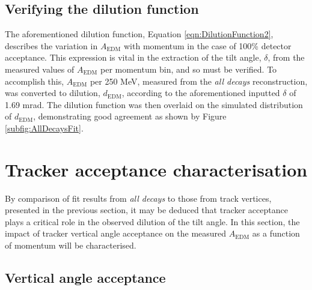 \subsection{Verifying the dilution function}

The aforementioned dilution function, Equation \ref{eqn:DilutionFunction2}, describes the variation in $A_{\text{EDM}}$ with momentum in the case of 100\% detector acceptance. This expression is vital in the extraction of the tilt angle, $\delta$, from the measured values of $A_{\text{EDM}}$ per momentum bin, and so must be verified. To accomplish this, $A_{\text{EDM}}$ per 250 MeV, measured from the \textit{all decays} reconstruction, was converted to dilution, $d_{\text{EDM}}$, according to the aforementioned inputted $\delta$ of 1.69 mrad. The dilution function was then overlaid on the simulated distribution of $d_{\text{EDM}}$, demonstrating good agreement as shown by Figure \ref{subfig:AllDecaysFit}. 

\section{Tracker acceptance characterisation}\label{sec:AcceptanceSim}

By comparison of fit results from \textit{all decays} to those from track vertices, presented in the previous section, it may be deduced that tracker acceptance plays a critical role in the observed dilution of the tilt angle. In this section, the impact of tracker vertical angle acceptance on the measured $A_{\text{EDM}}$ as a function of momentum will be characterised.




\subsection{Vertical angle acceptance}

